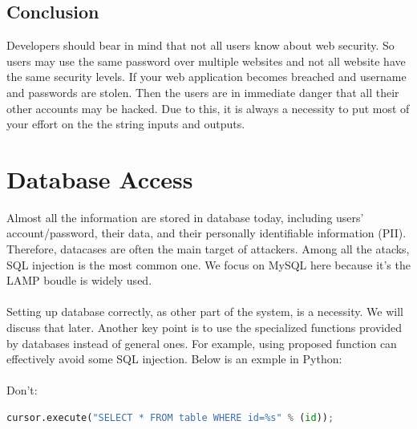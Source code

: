 \documentclass[conference]{IEEEtran}
\begin{document}
\subsection{Conclusion}
Developers should bear in mind that not all users know about web security. So users may use the same password over multiple websites and not all website have the same security levels. If your web application becomes breached and username and passwords are stolen. Then the users are in immediate danger that all their other accounts may be hacked. Due to this, it is always a necessity to put most of your effort on the the string inputs and outputs.

%   
\section{Database Access}
Almost all the information are stored in database today,
including users' account/password, their data, and their
personally identifiable information (PII).
Therefore,
datacases are often the main target of attackers.
Among all the atacks, SQL injection is the most common one.
We focus on MySQL here because it's the LAMP \cite{LAMP} boudle is widely used.
\\\\
Setting up database correctly, as other part of the system, is a necessity.
We will discuss that later.
Another key point is to use the specialized functions provided by databases
instead of general ones. For example, using proposed function can effectively
avoid some SQL injection. Below is an exmple in Python:
\\\\
Don't:
\begin{lstlisting}[language=python]
cursor.execute("SELECT * FROM table WHERE id=%s" % (id));
\end{lstlisting}
\end{document}
